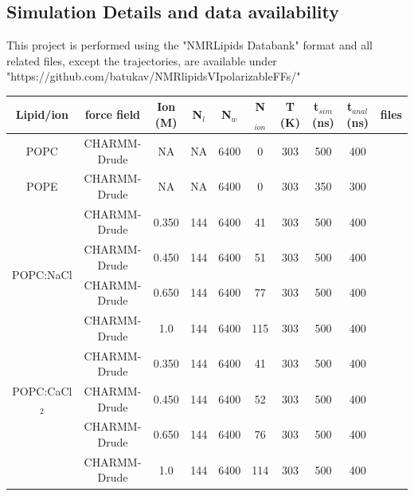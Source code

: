 \documentclass[journal=jacsat,manuscript=article,layout=singlecolumn]{achemso}
\begin{document}
\subsection{Simulation Details and data availability}
This project is performed using the "NMRLipids Databank" format and all related files, except the trajectories, are available under\\ "https://github.com/batukav/NMRlipidsVIpolarizableFFs/"


\newpage
\begin{table}[]
\begin{small}
\begin{tabular}{cccccccccc}
	Lipid/ion                & force field  & Ion (M) & N$_{l}$ & N$_{w}$ & N$_{ion}$ & T (K) & t$_{sim}$ (ns) & t$_{anal}$ (ns) & files \\ \hline
POPC                              & CHARMM-Drude & NA      & NA       & 6400       & 0         & 303    & 500              & 400         &          \cite{kav_batuhan_2021_4604630}    \\ \hline
POPE                              & CHARMM-Drude & NA      & NA       & 6400       & 0         & 303    & 350              & 300         &          \cite{kav_batuhan_2021_4665773}    \\ \hline
	\multirow{4}{*}{POPC:NaCl}        & CHARMM-Drude & 0.350   & 144      & 6400     & 41         & 303   & 500             & 400                  & \cite{kav_batuhan_2020_4683386}   \\
				  & CHARMM-Drude & 0.450   & 144      & 6400     & 51         & 303   & 500             & 400                  & \cite{kav_batuhan_2020_4683398}   \\
				  & CHARMM-Drude & 0.650   & 144      & 6400     & 77         & 303   & 500             & 400                  & \cite{kav_batuhan_2020_4683405}   \\
				  & CHARMM-Drude & 1.0     & 144      & 6400     & 115        & 303   & 500             & 400                  & \cite{kav_batuhan_2020_4683411}   \\ \hline
	\multirow{3}{*}{POPC:CaCl$_{2}$} & CHARMM-Drude & 0.350   & 144      & 6400     & 41         & 303   & 500             & 400                  & \cite{kav_batuhan_2020_4683393}   \\
				  & CHARMM-Drude & 0.450   & 144      & 6400     & 52         & 303   & 500             & 400                  & \cite{kav_batuhan_2020_4683391}   \\
				  & CHARMM-Drude & 0.650   & 144      & 6400     & 76         & 303   & 500             & 400                  & \cite{kav_batuhan_2020_4683394} \\
				  & CHARMM-Drude & 1.0   & 144      & 6400     & 114         & 303   & 500             & 400                  & \cite{kav_batuhan_2021_4738966}
				  

\end{tabular}
\end{small}
\end{table}
\end{document}
